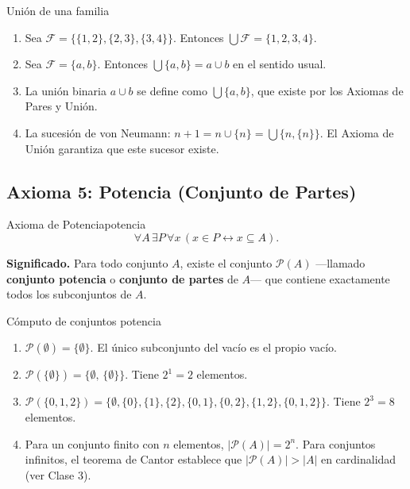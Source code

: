 \begin{ejemplo}{Unión de una familia}{}
\begin{enumerate}[leftmargin=2em, label=(\alph*)]
  \item Sea $\mathcal{F} = \{\{1,2\},\{2,3\},\{3,4\}\}$.
    Entonces $\bigcup \mathcal{F} = \{1,2,3,4\}$.

  \item Sea $\mathcal{F} = \{a, b\}$. Entonces $\bigcup\{a,b\} = a \cup b$ en el sentido usual.

  \item La unión binaria $a \cup b$ se define como $\bigcup\{a,b\}$, que existe por los Axiomas de Pares y Unión.

  \item La sucesión de von Neumann: $n+1 = n \cup \{n\} = \bigcup\{n, \{n\}\}$. El Axioma de Unión garantiza que este sucesor existe.
\end{enumerate}
\end{ejemplo}

\subsection{Axioma 5: Potencia (Conjunto de Partes)}

\begin{definicion}{Axioma de Potencia}{potencia}
\[
  \forall A\,\exists P\,\forall x\,(x \in P \leftrightarrow x \subseteq A).
\]
\end{definicion}

\textbf{Significado.} Para todo conjunto $A$, existe el conjunto $\mathcal{P}(A)$ —llamado \textbf{conjunto potencia} o \textbf{conjunto de partes} de $A$— que contiene exactamente todos los subconjuntos de $A$.

\begin{ejemplo}{Cómputo de conjuntos potencia}{}
\begin{enumerate}[leftmargin=2em, label=(\alph*)]
  \item $\mathcal{P}(\emptyset) = \{\emptyset\}$. El único subconjunto del vacío es el propio vacío.

  \item $\mathcal{P}(\{\emptyset\}) = \{\emptyset,\, \{\emptyset\}\}$. Tiene $2^1 = 2$ elementos.

  \item $\mathcal{P}(\{0,1,2\}) = \{\emptyset,\{0\},\{1\},\{2\},\{0,1\},\{0,2\},\{1,2\},\{0,1,2\}\}$. Tiene $2^3 = 8$ elementos.

  \item Para un conjunto finito con $n$ elementos, $|\mathcal{P}(A)| = 2^n$. Para conjuntos infinitos, el teorema de Cantor establece que $|\mathcal{P}(A)| > |A|$ en cardinalidad (ver Clase 3).
\end{enumerate}
\end{ejemplo}

